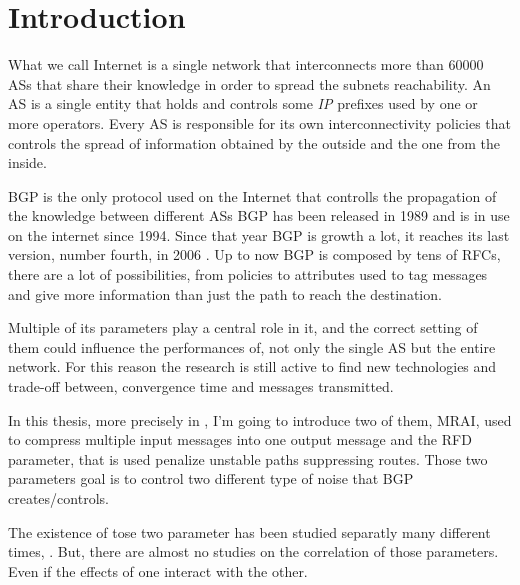 \chapter{Introduction}
\label{cha:introduction}



What we call Internet is a single network that interconnects more than \num{60000}
\acp{AS} that share their knowledge in order to spread the subnets reachability.
An \ac{AS} is a single entity that holds and controls some \textit{IP} prefixes
used by one or more operators.
Every \ac{AS} is responsible for its own interconnectivity policies that controls
the spread of information obtained by the outside and the one from the inside.

\ac{BGP} is the only protocol used on the Internet that controlls the propagation 
of the knowledge between different \acp{AS}
\ac{BGP} has been released in \num{1989} and is in use on the internet since 
\num{1994}.
Since that year \ac{BGP} is growth a lot, it reaches its last version, number
fourth, in \num{2006} \cite{rfc4271}.
Up to now \ac{BGP} is composed by tens of \acp{RFC}, there are a lot of possibilities,
from policies to attributes used to tag messages and give more information than
just the path to reach the destination.

Multiple of its parameters play a central role in it, and the correct setting
of them could influence the performances of, not only the single \ac{AS} but
the entire network.
For this reason the research is still active to find new technologies and
trade-off between, convergence time and messages transmitted.

In this thesis, more precisely in , I'm going to introduce
two of them, \ac{MRAI}, used to compress multiple input messages into one 
output message and the \ac{RFD} parameter, that is used penalize unstable paths
suppressing routes.
Those two parameters goal is to control two different type of noise that 
\ac{BGP} creates/controls.

The existence of tose two parameter has been studied separatly many different
times, \cite{fabrikant2011there,daggitt2018rate,qiu2005optimal,gray2020bgp}.
But, there are almost no studies on the correlation of those parameters.
Even if the effects of one interact with the other.

